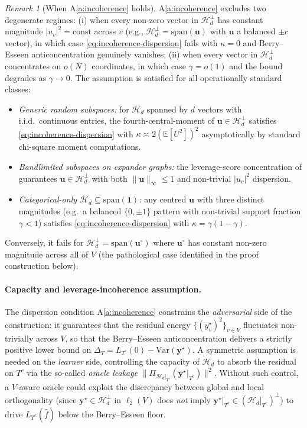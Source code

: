 \documentclass[11pt,a4paper]{article}
\theoremstyle{plain}
\theoremstyle{definition}
\theoremstyle{remark}
\newtheorem{remark}[theorem]{Remark}
\newcommand{\by}{\mathbf{y}}
\newcommand{\bu}{\mathbf{u}}
\newcommand{\bone}{\mathbf{1}}
\newcommand{\E}{\mathbb{E}}
\newcommand{\Var}{\mathrm{Var}}
\newcommand{\Hcal}{\mathcal{H}}
\begin{document}
\begin{remark}[When A\ref{a:incoherence} holds]
\label{rem:incoherence-when}
A\ref{a:incoherence} excludes two degenerate regimes: (i) when
every non-zero vector in $\Hcal_d^\perp$ has constant magnitude
$|u_v|^2 = \mathrm{const}$ across $v$ (e.g.,
$\Hcal_d^\perp = \mathrm{span}(\bu)$ with $\bu$ a balanced
$\pm c$ vector), in which case
\eqref{eq:incoherence-dispersion} fails with $\kappa = 0$ and
Berry--Esseen anticoncentration genuinely vanishes; (ii) when
every vector in $\Hcal_d^\perp$ concentrates on $o(N)$
coordinates, in which case $\gamma = o(1)$ and the bound
degrades as $\gamma \to 0$. The assumption is satisfied for
all operationally standard classes:
\begin{itemize}[label=$\bullet$,leftmargin=*]
\item \emph{Generic random subspaces:} for $\Hcal_d$ spanned by
    $d$ vectors with i.i.d.\ continuous entries, the
    fourth-central-moment of $\bu \in \Hcal_d^\perp$ satisfies
    \eqref{eq:incoherence-dispersion} with $\kappa \asymp
    2(\E[U^2])^2$ asymptotically by standard chi-square moment
    computations.
\item \emph{Bandlimited subspaces on expander graphs:} the
    leverage-score concentration of \citet{Cohen2016sparsification}
    guarantees $\bu \in \Hcal_d^\perp$ with both $\|\bu\|_\infty
    \le 1$ and non-trivial $|u_v|^2$ dispersion.
\item \emph{Categorical-only $\Hcal_d \subseteq \mathrm{span}(\bone)$:}
    any centred $\bu$ with three distinct magnitudes (e.g.\
    a balanced $\{0, \pm 1\}$ pattern with non-trivial support
    fraction $\gamma < 1$) satisfies
    \eqref{eq:incoherence-dispersion} with $\kappa = \gamma(1-\gamma)$.
\end{itemize}
Conversely, it fails for $\Hcal_d^\perp = \mathrm{span}(\bu^\circ)$
where $\bu^\circ$ has constant non-zero magnitude across all of $V$
(the pathological case identified in the proof construction
below).
\end{remark}

\paragraph{Capacity and leverage-incoherence assumption.}

The dispersion condition A\ref{a:incoherence} constrains the
\emph{adversarial} side of the construction: it guarantees that the
residual energy $\{(y^\star_v)^2\}_{v \in V}$ fluctuates non-trivially
across $V$, so that the Berry--Esseen anticoncentration delivers a
strictly positive lower bound on $\Delta_T = L_{T^c}(0) -
\Var(\by^\star)$.  A symmetric assumption is needed on the
\emph{learner} side, controlling the capacity of $\Hcal_d$ to absorb
the residual on $T^c$ via the so-called \emph{oracle leakage}
$\|\Pi_{\Hcal_d|_{T^c}}(\by^\star|_{T^c})\|^2$.  Without such control,
a $V$-aware oracle could exploit the discrepancy between global and
local orthogonality (since $\by^\star \in \Hcal_d^\perp$ in
$\ell_2(V)$ does \emph{not} imply $\by^\star|_{T^c} \in
(\Hcal_d|_{T^c})^\perp$) to drive $L_{T^c}(\hat f)$ below the
Berry--Esseen floor.
\end{document}
